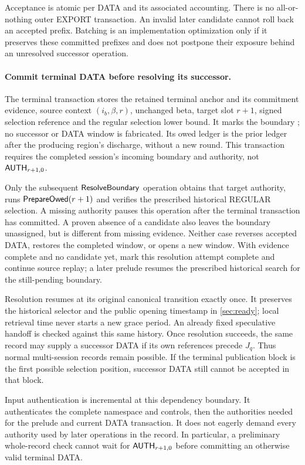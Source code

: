 Acceptance is atomic per DATA and its associated accounting. There is
no all-or-nothing outer EXPORT transaction. An invalid later candidate
cannot roll back an accepted prefix. Batching is an implementation
optimization only if it preserves these committed prefixes and does
not postpone their exposure behind an unresolved successor operation.

\paragraph{Commit terminal DATA before resolving its successor.}
\label{sec:terminal-commit}
The terminal transaction stores the retained terminal anchor and its
commitment evidence, source context $(i_b,\beta,r)$, unchanged beta,
target slot $r+1$, signed selection reference and the regular selection
lower bound. It marks the boundary ; no
successor or DATA window is fabricated. Its owed ledger is the prior
ledger after the producing region's discharge, without a new round.
This transaction requires the completed session's incoming boundary
and authority, not $\mathsf{AUTH}_{r+1,0}$.

Only the subsequent $\mathsf{ResolveBoundary}$ operation obtains that
target authority, runs $\mathsf{PrepareOwed}(r+1)$ and verifies the
prescribed historical REGULAR selection. A missing authority pauses
this operation after the terminal transaction has committed. A proven
absence of a candidate also leaves the boundary unassigned, but is
different from missing evidence. Neither case reverses accepted DATA,
restores the completed window, or opens a new window.
With evidence complete and no candidate yet, mark this resolution
attempt complete and continue source replay; a later prelude resumes
the prescribed historical search for the still-pending boundary.

Resolution resumes at its original canonical transition exactly once.
It preserves the historical selector and the public opening timestamp
in \cref{sec:ready}; local retrieval time never starts a new grace
period. An already fixed speculative handoff is checked against this
same history. Once resolution succeeds, the same record may supply a
successor DATA if its own references precede $J_q$. Thus normal
multi-session records remain possible. If the terminal publication
block is the first possible selection position, successor DATA still
cannot be accepted in that block.

Input authentication is incremental at this dependency boundary. It
authenticates the complete namespace and controls, then the authorities
needed for the prelude and current DATA transaction. It does not eagerly
demand every authority used by later operations in the record. In
particular, a preliminary whole-record check cannot wait for
$\mathsf{AUTH}_{r+1,0}$ before committing an otherwise valid terminal DATA.

